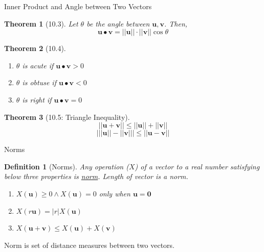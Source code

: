 \documentclass[final]{beamer}
\newtheorem{defn}{Definition}
\newtheorem{thm}{Theorem}
\begin{document}
\begin{frame}[t]{Inner Product and Angle between Two Vectors}
	\begin{thm}
		[10.3] Let $\theta$ be the angle between $\mathbf{u,v}$. Then, \[
			\mathbf{u\bullet v} = ||\mathbf{u}||\cdot||\mathbf{v}||\cos \theta
		\]
	\end{thm}
	\begin{thm}
		[10.4] \begin{enumerate}
			\item $\theta$ is acute if $\mathbf{u\bullet v}>0$
			\item $\theta$ is obtuse if $\mathbf{u\bullet v}<0$
			\item $\theta$ is right if $\mathbf{u\bullet v}=0$
		\end{enumerate}
	\end{thm}
	\begin{thm}
		[10.5: Triangle Inequality]
		\[
			||\mathbf{u+v}||\le ||\mathbf{u}||+||\mathbf{v}||
		\]\[
			\big| ||\mathbf{u}||-||\mathbf{v}|| \big|\le ||\mathbf{u-v}||
		\]
	\end{thm}
\end{frame}

\begin{frame}[t]{Norms}
	\begin{defn}[Norms]
		Any operation ($X$) of a vector to a real number satisfying below three properties is \uline{norm}. Length of vector is a norm. 
		\begin{enumerate}
			\item $X(\mathbf{u})\ge 0 \land X(\mathbf{u})=0$ only when $\mathbf{u}=\mathbf{0}$
			\item $X(r\mathbf{u})=|r|X(\mathbf{u})$
			\item $X(\mathbf{u+v})\le X(\mathbf{u})+X(\mathbf{v})$
		\end{enumerate}
	\end{defn}
	Norm is set of distance measures between two vectors. 
\end{frame}
\end{document}

